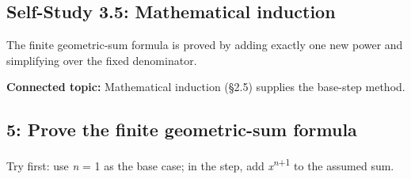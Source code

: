 \documentclass[11pt]{article}
\begin{document}
\begin{keepsection}
\section{Self-Study 3.5: Mathematical induction}

The finite geometric-sum formula is proved by adding exactly one new power and simplifying over the fixed denominator.

\textbf{Connected topic:} Mathematical induction (§2.5) supplies the base-step method.

\begin{keepsection}
\subsection{5: Prove the finite geometric-sum formula}

Try first: use \textit{n} = 1 as the base case; in the step, add \textit{x}\textsuperscript{\textit{n}+1} to the assumed sum.

\end{keepsection}
\end{keepsection}
\end{document}
